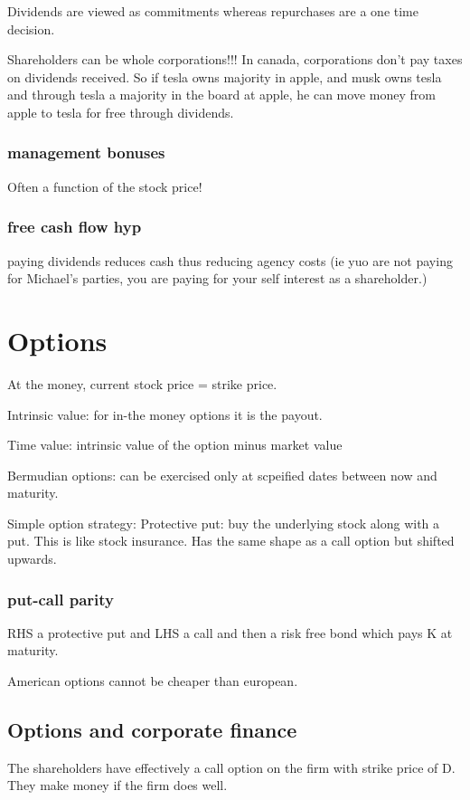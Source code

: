\documentclass{article}
\begin{document}
Dividends are viewed as commitments whereas repurchases are a one time decision. 

Shareholders can be whole corporations!!! In canada, corporations don't pay taxes on dividends received. So if tesla owns majority in apple, and musk owns tesla and through tesla a majority in the board at apple, he can move money from apple to tesla for free through dividends. 

\subsubsection{management bonuses}
Often a function of the stock price!

\subsubsection{free cash flow hyp}
paying dividends reduces cash thus reducing agency costs (ie yuo are not paying for Michael's parties, you are paying for your self interest as a shareholder.) 

\section{Options}
At the money, current stock price = strike price.

Intrinsic value: for in-the money options it is the payout. 

Time value: intrinsic value of the option minus market value

Bermudian options: can be exercised only at scpeified dates between now and maturity. 

Simple option strategy:
Protective put: buy the underlying stock along with a put. This is like stock insurance. Has the same shape as a call option but shifted upwards. 

\subsubsection{put-call parity}
RHS a protective put and LHS a call and then a risk free bond which pays K at maturity.

American options cannot be cheaper than european.

\subsection{Options and corporate finance}
The shareholders have effectively a call option on the firm with strike price of D. They make money if the firm does well.
\end{document}
